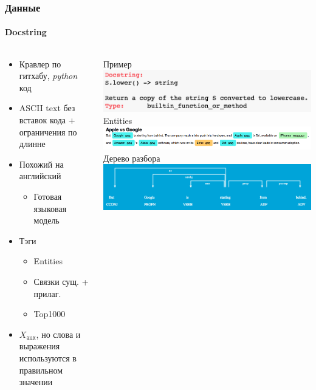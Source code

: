 \documentclass[10pt]{beamer}
\newcommand{\X}[1]{X_{\texttt{#1}}}
\newcommand{\Xaux}{\X{aux}}
\begin{document}
\begin{frame}
\frametitle{Данные}
\framesubtitle{Docstring}

\begin{columns}[T]
    \begin{column}[T]{0.5\textwidth}
        \begin{itemize}
            \item Кравлер по гитхабу, \textit{python} код
            \item ASCII text без вставок кода + ограничения по длинне
            \item Похожий на английский
            \begin{itemize}
                \item Готовая языковая модель
            \end{itemize}
            \item Тэги
            \begin{itemize}
                \item Entities
                \item Связки сущ. + прилаг.
                \item Top1000
            \end{itemize}
            \item $\Xaux$, но слова и выражения используются в правильном значении
        \end{itemize}
    \end{column}
    \begin{column}[T]{0.5\textwidth}
        \vskip-5mm
        \begin{center}
            Пример
            \includegraphics[width=1\textwidth]{images/docstring2.png} \\
            Entities
            \includegraphics[width=1\textwidth]{images/entities.png} \\
            Дерево разбора
            \includegraphics[width=1\textwidth]{images/syntax_tree.png} \\

\end{center}
\end{column}
\end{columns}
\end{frame}
\end{document}
